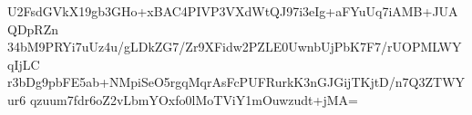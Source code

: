 U2FsdGVkX19gb3GHo+xBAC4PIVP3VXdWtQJ97i3eIg+aFYuUq7iAMB+JUAQDpRZn
34bM9PRYi7uUz4u/gLDkZG7/Zr9XFidw2PZLE0UwnbUjPbK7F7/rUOPMLWYqIjLC
r3bDg9pbFE5ab+NMpiSeO5rgqMqrAsFcPUFRurkK3nGJGijTKjtD/n7Q3ZTWYur6
qzuum7fdr6oZ2vLbmYOxfo0lMoTViY1mOuwzudt+jMA=
